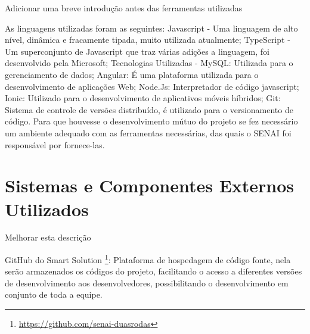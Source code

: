 {\color{red} Adicionar uma breve introdução antes das ferramentas utilizadas}

As linguagens utilizadas foram  as seguintes: Javascript - Uma linguagem de alto nível, dinâmica e fracamente tipada, muito utilizada atualmente; TypeScript - Um superconjunto de Javascript que traz várias adições a linguagem, foi desenvolvido pela Microsoft; Tecnologias Utilizadas - MySQL: Utilizada para o gerenciamento de dados; Angular: É uma plataforma utilizada para o desenvolvimento de aplicações Web; Node.Js: Interpretador de código javascript; Ionic: Utilizado para o desenvolvimento de aplicativos móveis híbridos; Git: Sistema de controle de versões distribuído, é utilizado para o versionamento de código. Para que houvesse o desenvolvimento mútuo do projeto se fez necessário um ambiente adequado com as ferramentas necessárias, das quais o SENAI foi responsável por fornece-las.


\section{Sistemas e Componentes Externos Utilizados}


{\color{red} Melhorar esta descrição}


GitHub do Smart Solution \footnote{\url{https://github.com/senai-duasrodas}}: Plataforma de hospedagem de código fonte, nela serão armazenados os códigos do projeto, facilitando o acesso a diferentes versões de desenvolvimento aos desenvolvedores, possibilitando o desenvolvimento em conjunto de toda a equipe.

\newpage

